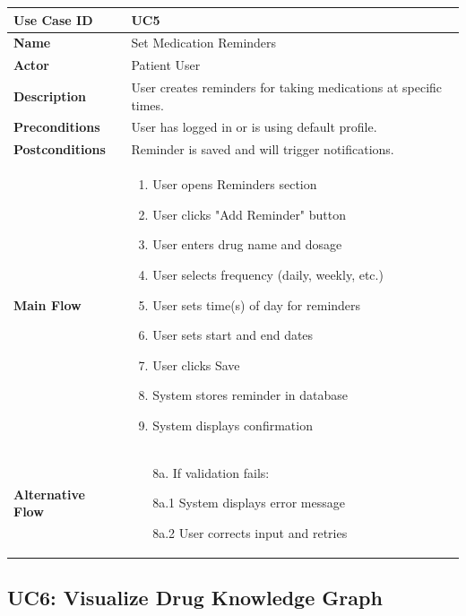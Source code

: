 \documentclass[12pt,a4paper]{report}
\begin{document}
\begin{tabularx}{\textwidth}{|l|X|}
\hline
\textbf{Use Case ID} & UC5 \\
\hline
\textbf{Name} & Set Medication Reminders \\
\hline
\textbf{Actor} & Patient User \\
\hline
\textbf{Description} & User creates reminders for taking medications at specific times. \\
\hline
\textbf{Preconditions} & User has logged in or is using default profile. \\
\hline
\textbf{Postconditions} & Reminder is saved and will trigger notifications. \\
\hline
\textbf{Main Flow} & 
\begin{enumerate}[nosep]
    \item User opens Reminders section
    \item User clicks "Add Reminder" button
    \item User enters drug name and dosage
    \item User selects frequency (daily, weekly, etc.)
    \item User sets time(s) of day for reminders
    \item User sets start and end dates
    \item User clicks Save
    \item System stores reminder in database
    \item System displays confirmation
\end{enumerate} \\
\hline
\textbf{Alternative Flow} & 
\begin{enumerate}[nosep]
    \item[8a.] If validation fails:
    \item[8a.1] System displays error message
    \item[8a.2] User corrects input and retries
\end{enumerate} \\
\hline
\end{tabularx}

\subsection{UC6: Visualize Drug Knowledge Graph}
\end{document}
